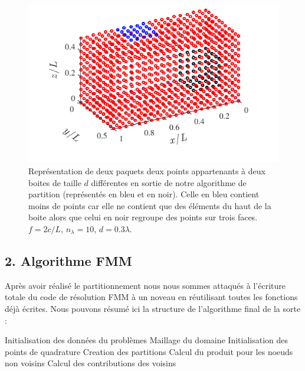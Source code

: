 \documentclass[10pt]{article}
\begin{document}
\begin{multicols}{2}
\begin{figure}[H]
  \begin{center}
  \includegraphics[width=0.95\columnwidth]{Q6.pdf}
  \vspace*{-11pt}
  \caption{Représentation de deux paquets deux points appartenants à deux boites de taille $d$ différentes en sortie de notre algorithme de partition (représentés en bleu et en noir). Celle en bleu contient moins de points car elle ne contient que des éléments du haut de la boite alors que celui en noir regroupe des points sur trois faces. $f=2c/L$, $n_\lambda = 10$, $d=0.3\lambda$.}
  \label{fig:Q6}
  \end{center}
\end{figure}

\subsection*{2. Algorithme FMM}

Après avoir réalisé le partitionnement nous nous sommes attaqués à l'écriture totale du code de résolution FMM à un noveau en réutilisant toutes les fonctions déjà écrites. Nous pouvons résumé ici la structure de l'algorithme final de la sorte : 

\begin{algorithm}[H]
	\begin{algorithmic}[1]
		\State Initialisation des données du problèmes
        \State Maillage du domaine
        \State Initialisation des points de quadrature
        \State Creation des partitions
        \State Calcul du produit pour les noeuds non voisins
        \State Calcul des contributions des voisins
	\end{algorithmic}
\end{algorithm}
    


\end{multicols}
\end{document}
